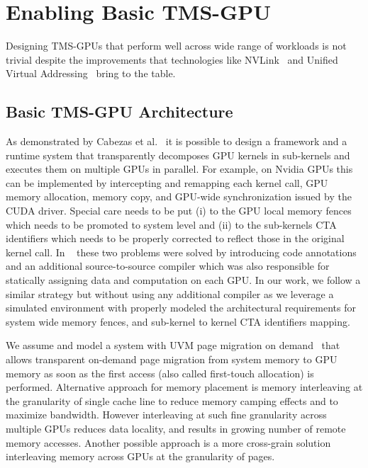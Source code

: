 \section{Enabling Basic TMS-GPU}

Designing TMS-GPUs that 
perform well across wide range of workloads is not trivial despite the 
improvements that technologies like NVLink~\cite{NVLINK} and Unified Virtual 
Addressing~\cite{UVM} bring to the table. 



\subsection{Basic TMS-GPU Architecture}
As demonstrated by Cabezas et al.~\cite{Cabezas2015} it is possible to design 
a framework and a runtime system that transparently decomposes GPU kernels in 
sub-kernels and executes them on multiple GPUs in parallel. For example, on 
Nvidia GPUs this can be implemented by intercepting and remapping each kernel 
call, GPU memory allocation, memory copy, and GPU-wide synchronization issued 
by the CUDA driver. Special care needs to be put (i) to the GPU local memory 
fences which needs to be promoted to system level and (ii) to the sub-kernels 
CTA identifiers which needs to be properly corrected to reflect those in the 
original kernel call. In ~\cite{Cabezas2015} these two problems were solved 
by introducing  code annotations and an additional source-to-source compiler 
which was also responsible for statically assigning data and computation on 
each GPU. In our work, we follow a similar strategy but without using any 
additional compiler as we leverage a simulated environment with properly 
modeled the architectural requirements for system wide memory fences, and 
sub-kernel to kernel CTA identifiers mapping. 

We assume and model a system with UVM page migration on demand~\cite{P100} that
allows transparent on-demand page migration from system memory to GPU memory as
soon as the first access (also called first-touch allocation) is performed.
Alternative approach for memory placement is memory interleaving at the
granularity of single cache line to reduce memory camping effects and to
maximize bandwidth. However interleaving at such fine granularity across
multiple GPUs reduces data locality, and results in growing number of remote
memory accesses. Another possible approach is a more cross-grain solution
interleaving memory across GPUs at the granularity of pages. 

